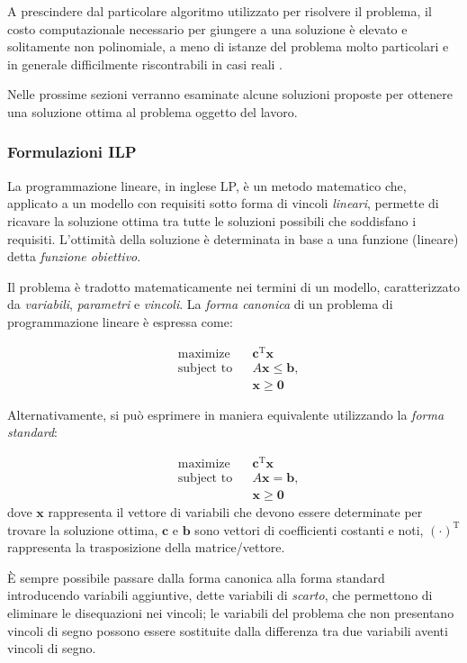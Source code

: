 A prescindere dal particolare algoritmo utilizzato per risolvere il problema, 
il costo computazionale necessario per giungere a una soluzione è elevato e 
solitamente non polinomiale, a meno di istanze del problema molto particolari e 
in generale difficilmente riscontrabili in casi reali 
\cite{PolynomialCompleteScheduling}.

Nelle prossime sezioni verranno esaminate alcune soluzioni proposte per 
ottenere una soluzione ottima al problema oggetto del lavoro.

\subsubsection{Formulazioni ILP}
La programmazione lineare, in inglese \ac{LP}, è un metodo matematico che, 
applicato a un modello con requisiti sotto forma di vincoli \emph{lineari}, 
permette di ricavare la soluzione ottima tra tutte le soluzioni possibili che 
soddisfano i requisiti. L'ottimità della soluzione è determinata in base a una 
funzione (lineare) detta \emph{funzione obiettivo}.

Il problema è tradotto matematicamente nei termini di un modello, 
caratterizzato da \emph{variabili}, \emph{parametri} e \emph{vincoli}.
La \emph{forma canonica} di un problema di programmazione lineare è espressa 
come:

\begin{align*}
& \text{maximize}   && \mathbf{c}^\mathrm{T} \mathbf{x}\\
& \text{subject to} && A \mathbf{x} \le \mathbf{b},\\
&  && \mathbf{x} \ge \mathbf{0}
\end{align*}

Alternativamente, si può esprimere in maniera equivalente utilizzando la 
\emph{forma standard}:

\begin{align*}
 & \text{maximize}   && \mathbf{c}^\mathrm{T} \mathbf{x}\\
& \text{subject to} && A \mathbf{x} = \mathbf{b}, \\
&  && \mathbf{x} \ge \mathbf{0}
\end{align*}
dove $\mathbf{x}$ rappresenta il vettore di variabili che devono essere 
determinate per trovare la soluzione ottima, $\mathbf{c}$ e $\mathbf{b}$ sono 
vettori di coefficienti costanti e noti, $(\mathord{\cdot})^\mathrm{T}$ 
rappresenta la trasposizione della matrice/vettore.

È sempre possibile passare dalla forma canonica alla forma standard 
introducendo variabili aggiuntive, dette variabili di \emph{scarto}, che 
permettono di eliminare le disequazioni nei vincoli; le variabili del problema 
che non presentano vincoli di segno possono essere sostituite dalla differenza 
tra due variabili aventi vincoli di segno.

